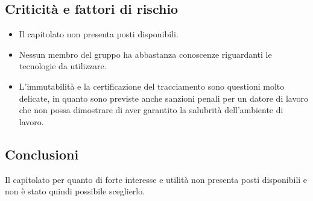 \subsection{Criticità e fattori di rischio}
\begin{itemize}
    \item Il capitolato non presenta posti disponibili.
    \item Nessun membro del gruppo ha abbastanza conoscenze riguardanti le tecnologie da utilizzare.
    \item L'immutabilità e la certificazione del tracciamento sono questioni molto delicate, in quanto sono previste anche sanzioni penali per un datore di lavoro che non possa dimostrare di aver garantito la salubrità dell’ambiente di lavoro.
\end{itemize}

\subsection{Conclusioni}
Il capitolato per quanto di forte interesse e utilità non presenta posti disponibili e non è stato quindi possibile sceglierlo.